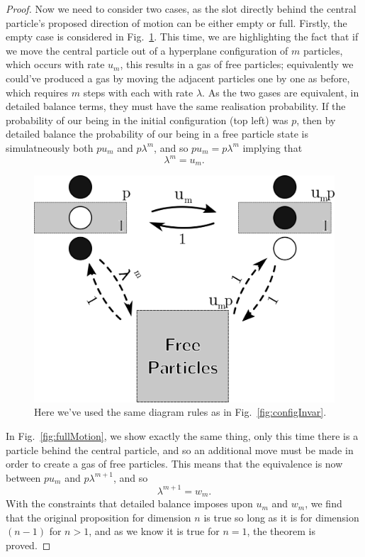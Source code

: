\begin{proof}
Now we need to consider two cases, as the slot directly behind the central particle's proposed direction of motion can be either
empty or full. Firstly, the empty case is considered in Fig.~\ref{fig:emptyMotion}. This time, we are highlighting the fact that if we move the central particle out of a hyperplane configuration of $m$ particles, which occurs with rate $u_m$, this results in a gas of free particles;
 equivalently we could've produced a gas by moving the adjacent particles one by one as before, which requires $m$ steps with each with rate $\lambda$. As the two gases are equivalent, in detailed balance terms, they must have the same realisation probability. If the
 probability of our being in the initial configuration (top left) was $p$, then by detailed balance the probability of our being in
 a free particle state is simulatneously both $p u_m$ and $p \lambda^m$, and so
 $p u_m = p \lambda^m $ implying that
 \begin{equation}
  \lambda^m = u_m .
 \end{equation}
 
 \begin{figure}[h!]
 \caption[Figure demonstrating that particle motion out of a hyperplane with $m$ adjacent particles away from an empty space moves with rate $\lambda^m$.]{\label{fig:emptyMotion} 
 Here we've used the same diagram rules as in Fig.~\ref{fig:configInvar}. 
 }
  \begin{center}
 \includegraphics[width=0.66\linewidth]{analytics/images/ndDBuCycle}
  \end{center}
\end{figure}

In Fig.~\ref{fig:fullMotion}, we show exactly the same thing, only this time there is a particle behind the central particle, and so an
additional move must be made in order to create a gas of free particles. This means that the equivalence is now between $p u_m$ and
$p \lambda^{m+1}$, and so
 \begin{equation}
  \lambda^{m+1} = w_m .
 \end{equation}
 With the constraints that detailed balance imposes upon $u_m$ and $w_m$, we find that the original proposition for dimension $n$ is true so long as it is for dimension $(n-1)$ for $n>1$, and as we know it is true for $n=1$, the theorem is proved.


\end{proof}
